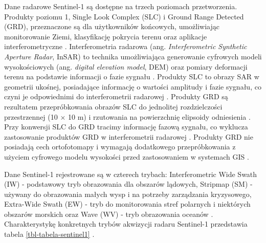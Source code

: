 \documentclass{amuthesis}
\begin{document}
Dane radarowe Sentinel-1 są dostępne na trzech poziomach przetworzenia.
Produkty poziomu 1, Single Look Complex (SLC) i Ground Range Detected
(GRD), przeznaczone są dla użytkowników końcowych, umożliwiając
monitorowanie Ziemi, klasyfikację pokrycia terenu oraz aplikacje
interferometryczne \autocite{hejmanowska_2020_dane}. Interferometria
radarowa (ang. \emph{Interferometric Synthetic Aperture Radar}, InSAR)
to technika umożliwiająca generowanie cyfrowych modeli wysokościowych
(ang. \emph{digital elevation model}, DEM) oraz pomiary deformacji
terenu na podstawie informacji o fazie sygnału
\autocite{hanssen_2001_insar,hejmanowska_2020_dane}. Produkty SLC to
obrazy SAR w geometrii ukośnej, posiadające informację o wartości
amplitudy i fazie sygnału, co czyni je odpowiednimi do interferometrii
radarowej \autocite{hejmanowska_2020_dane}. Produkty GRD są rezultatem
przepróbkowania obrazów SLC do jednolitej rozdzielczości przestrzennej
(10 × 10 m) i rzutowania na powierzchnię elipsoidy odniesienia
\autocite{hejmanowska_2020_dane}. Przy konwersji SLC do GRD tracimy
informację fazową sygnału, co wyklucza zastosowanie produktów GRD w
interferometrii radarowej \autocite{sentinel1_products}. Produkty GRD
nie posiadają cech ortofotomapy i wymagają dodatkowego przepróbkowania z
użyciem cyfrowego modelu wysokości przed zastosowaniem w systemach GIS
\autocite{hejmanowska_2020_dane}.

Dane Sentinel-1 rejestrowane są w czterech trybach: Interferometric Wide
Swath (IW) - podstawowy tryb obrazowania dla obszarów lądowych, Stripmap
(SM) - używany do obrazowania małych wysp i na potrzeby zarządzania
kryzysowego, Extra-Wide Swath (EW) - tryb do monitorowania stref
polarnych i niektórych obszarów morskich oraz Wave (WV) - tryb
obrazowania oceanów
\autocite{hejmanowska_2020_dane,sentinel1_instrument_payload,sentinel1_stripmap}.
Charakterystykę konkretnych trybów akwizycji radaru Sentinel-1
przedstawia tabela \ref{tbl-tabela-sentinel1}
\autocite{sentinel1_resolution_swath}.
\end{document}
